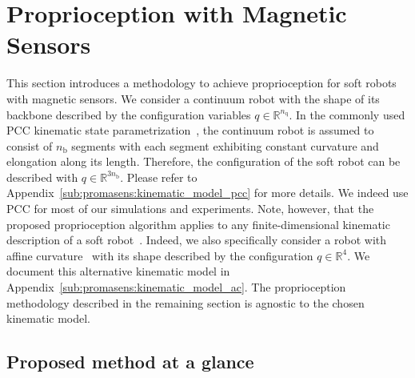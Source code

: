 
\section{Proprioception with Magnetic Sensors}

This section introduces a methodology to achieve proprioception for soft robots with magnetic sensors.
%
We consider a continuum robot with the shape of its backbone described by the configuration variables $q \in \mathbb{R}^{n_\mathrm{q}}$.
In the commonly used \gls{PCC} kinematic state parametrization~\cite{webster2010design}, the continuum robot is assumed to consist of $n_\mathrm{b}$ segments with each segment exhibiting constant curvature and elongation along its length. Therefore, the configuration of the soft robot can be described with $q \in \mathbb{R}^{3n_\mathrm{b}}$.
Please refer to Appendix~\ref{sub:promasens:kinematic_model_pcc} for more details.
We indeed use PCC for most of our simulations and experiments.
Note, however, that the proposed proprioception algorithm applies to any finite-dimensional kinematic description of a soft robot~\cite{armanini2023soft}.
Indeed, we also specifically consider a robot with affine curvature~\cite{della2020soft, stella2022piecewise_preprint} with its shape described by the configuration $q \in \mathbb{R}^4$. We document this alternative kinematic model in Appendix~\ref{sub:promasens:kinematic_model_ac}.
The proprioception methodology described in the remaining section is agnostic to the chosen kinematic model.

\subsection{Proposed method at a glance}

